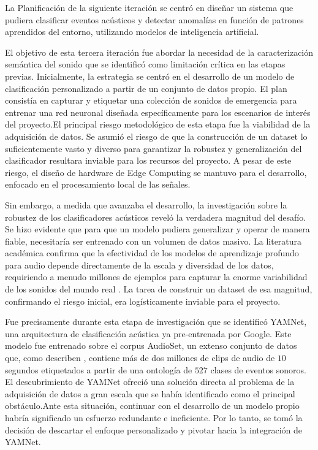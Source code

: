       La Planificación de la siguiente iteración se centró en diseñar un sistema que pudiera clasificar eventos acústicos y detectar anomalías en función de patrones aprendidos del entorno, utilizando modelos de inteligencia artificial.   
      



El objetivo de esta tercera iteración fue abordar la necesidad de la caracterización semántica del sonido que se identificó como limitación crítica en las etapas previas. Inicialmente, la estrategia se centró en el desarrollo de un modelo de clasificación personalizado a partir de un conjunto de datos propio. El plan consistía en capturar y etiquetar una colección de sonidos de emergencia para entrenar una red neuronal diseñada específicamente para los escenarios de interés del proyecto.El principal riesgo metodológico de esta etapa fue la viabilidad de la adquisición de datos. Se asumió el riesgo de que la construcción de un dataset lo suficientemente vasto y diverso para garantizar la robustez y generalización del clasificador resultara inviable para los recursos del proyecto. A pesar de este riesgo, el diseño de hardware de Edge Computing se mantuvo para el desarrollo, enfocado en el procesamiento local de las señales.

Sin embargo, a medida que avanzaba el desarrollo, la investigación sobre la robustez de los clasificadores acústicos reveló la verdadera magnitud del desafío. Se hizo evidente que para que un modelo pudiera generalizar y operar de manera fiable, necesitaría ser entrenado con un volumen de datos masivo. La literatura académica confirma que la efectividad de los modelos de aprendizaje profundo para audio depende directamente de la escala y diversidad de los datos, requiriendo a menudo millones de ejemplos para capturar la enorme variabilidad de los sonidos del mundo real \cite{gemmeke2017audio}. La tarea de construir un dataset de esa magnitud, confirmando el riesgo inicial, era logísticamente inviable para el proyecto.

Fue precisamente durante esta etapa de investigación que se identificó YAMNet, una arquitectura de clasificación acústica ya pre-entrenada por Google. Este modelo fue entrenado sobre el corpus AudioSet, un extenso conjunto de datos que, como describen \citeauthor{gemmeke2017audio} \citeyear{gemmeke2017audio}, contiene más de dos millones de clips de audio de $10$ segundos etiquetados a partir de una ontología de $527$ clases de eventos sonoros. El descubrimiento de YAMNet ofreció una solución directa al problema de la adquisición de datos a gran escala que se había identificado como el principal obstáculo.Ante esta situación, continuar con el desarrollo de un modelo propio habría significado un esfuerzo redundante e ineficiente. Por lo tanto, se tomó la decisión de descartar el enfoque personalizado y pivotar hacia la integración de YAMNet. 

